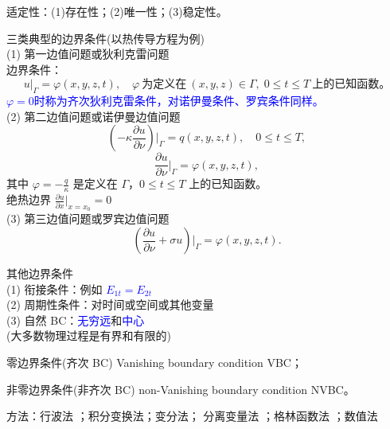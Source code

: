 \documentclass[12pt, a4paper, oneside, UTF8]{ctexbook}
\begin{document}
适定性：(1)存在性；(2)唯一性；(3)稳定性。

\noindent 三类典型的边界条件(以热传导方程为例)  \\
(1) 第一边值问题或狄利克雷问题  \\
边界条件：
 \[ u|_\varGamma = \varphi(x,y,z,t),\quad \varphi\ \mbox{为定义在}\ (x,y,z)\in \varGamma,\;
0\leqslant t \leqslant T\ \mbox{上的已知函数。} \]
\textcolor{blue}{$\varphi=0$时称为齐次狄利克雷条件，对诺伊曼条件、罗宾条件同样。}  \\
(2) 第二边值问题或诺伊曼边值问题
\[ (-\kappa \frac{\partial{u}}{\partial{\nu}})|_\varGamma = q(x,y,z,t),\quad 0\leqslant t \leqslant T,\]
\[ \frac{\partial{u}}{\partial{\nu}}|_\varGamma = \varphi(x,y,z,t),\] 
其中 $\varphi=-\frac{q}{\kappa}$ 是定义在 $\varGamma$，$0 \leqslant t \leqslant T$ 上的已知函数。  \\
 绝热边界 $ \frac{\partial{u}}{\partial{x}}|_{x=x_0} = 0 $  \\
(3) 第三边值问题或罗宾边值问题
\[ (\frac{\partial{u}}{\partial{\nu}}+\sigma u)|_\varGamma = \varphi(x,y,z,t). \]

\noindent 其他边界条件  \\
(1) 衔接条件：例如 \textcolor{blue}{$E_{1t}=E_{2t}$}  \\
(2) 周期性条件：对时间或空间或其他变量  \\
(3) 自然 BC：\textcolor{blue}{无穷远}和\textcolor{blue}{中心}  \\
(大多数物理过程是有界和有限的)

零边界条件(齐次 BC) Vanishing boundary condition VBC；

非零边界条件(非齐次 BC) non-Vanishing boundary condition NVBC。

方法：行波法 ；积分变换法；变分法；
分离变量法 ；格林函数法 ；数值法

\ifx\allfiles\undefined
\end{document}
